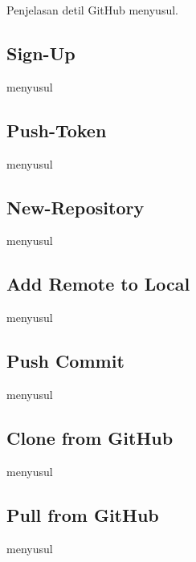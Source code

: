 \documentclass[12pt]{book}
\begin{document}
	Penjelasan detil GitHub menyusul.
	
	\subsection{Sign-Up}
	
	menyusul
	\subsection{Push-Token}
	
	menyusul
	\subsection{New-Repository}
	
	menyusul
	\subsection{Add Remote to Local}
	
	menyusul
	\subsection{Push Commit}
	
	menyusul
	\subsection{Clone from GitHub}
	
	menyusul
	\subsection{Pull from GitHub}
	
	menyusul
	
\end{document}
